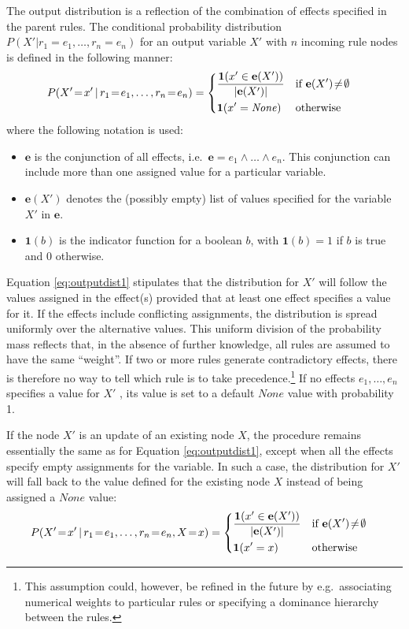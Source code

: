 The output distribution is a reflection of the combination of effects specified in the parent rules. The conditional probability distribution $P(X'|r_1\!=\!e_1, \dots, r_n\!=\!e_n)$ for an output variable $X'$ with $n$ incoming rule nodes is defined in the following manner:
\begin{align}
&P(X'\!=\!x' \, | \, r_1\!=\!e_1, \dots, r_n\!=\!e_n) = \begin{dcases}
\frac{\mathbf{1}(x' \in {\mathbf{e}(X')})} { |\mathbf{e}(X')| } & \text{if } \mathbf{e}(X')\!\neq\!\emptyset \\
\mathbf{1}(x' = \mathit{None}) & \text{otherwise}
\end{dcases}
\label{eq:outputdist1}
\end{align}
where the following notation is used: \begin{itemize}
\item $\mathbf{e}$ is the conjunction of all effects, i.e.\ $\mathbf{e} = e_1 \land \dots \land e_n$.  This conjunction can include more than one assigned value for a particular variable.
\item $\mathbf{e}(X')$ denotes the (possibly empty) list of values specified for the variable $X'$ in $\mathbf{e}$. 
\item $\mathbf{1}(b)$ is the indicator function for a boolean $b$, with $\mathbf{1}(b)=1$ if $b$ is true and $0$ otherwise.
\end{itemize}

Equation \eqref{eq:outputdist1} stipulates that the distribution for $X'$ will follow the values assigned in the effect(s) provided that at least one effect specifies a value for it. If the effects include conflicting assignments, the distribution is spread uniformly over the alternative values. This uniform division of the probability mass reflects that, in the absence of further knowledge, all rules are assumed to have the same ``weight''. If two or more rules generate contradictory effects, there is therefore no way to tell which rule is to take precedence.\footnote{This assumption could, however, be refined in the future by e.g.\ associating numerical weights to particular rules or specifying a dominance hierarchy between the rules.} If no effects $e_1, \dots, e_n$ specifies a value for $X'$ , its value is set to a default $None$ value with probability 1. 

If the node $X'$ is an update of an existing node $X$, the procedure remains essentially the same as for Equation \eqref{eq:outputdist1}, except when all the effects specify empty assignments for the variable. In such a case, the distribution for $X'$ will fall back to the value defined for the existing node $X$ instead of being assigned a $\mathit{None}$ value:
\begin{align}
&P(X'\!=\!x' \, | \, r_1\!=\!e_1, \dots, r_n\!=\!e_n, X\!=\!x) = \begin{dcases} 
\frac{\mathbf{1}(x' \in {\mathbf{e}(X')})} { |\mathbf{e}(X')| }  & \text{if } \mathbf{e}(X')\!\neq\!\emptyset \\
\mathbf{1}(x' = x) & \text{otherwise}
\end{dcases}\label{eq:outputdist2}
\end{align}


